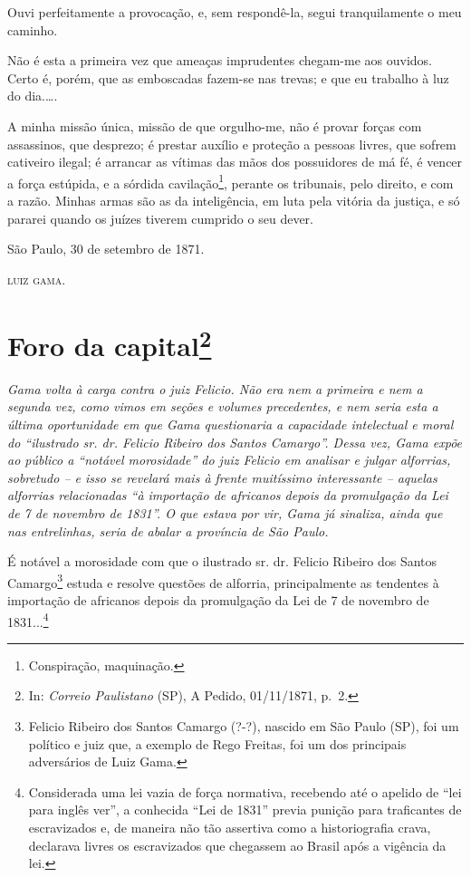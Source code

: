 {Ouvi perfeitamente a provocação, e, sem respondê-la, segui
tranquilamente o meu caminho.

Não é esta a primeira vez que ameaças imprudentes chegam-me aos
ouvidos.\\
Certo é, porém, que as emboscadas fazem-se nas trevas; e que eu trabalho
à luz do dia.\ldots.

A minha missão única, missão de que orgulho-me, não é provar forças com
assassinos, que desprezo; é prestar auxílio e proteção a pessoas livres,
que sofrem cativeiro ilegal; é arrancar as vítimas das mãos dos
possuidores de má fé, é vencer a força estúpida, e a sórdida
cavilação\footnote{ Conspiração, maquinação.}, perante os tribunais,
pelo direito, e com a razão. Minhas armas são as da inteligência, em
luta pela vitória da justiça, e só pararei quando os juízes tiverem
cumprido o seu dever.

São Paulo, 30 de setembro de 1871.

\textsc{luiz gama}.

\chapter{Foro da capital\footnote{ In: \emph{Correio Paulistano} (SP), A Pedido, 01/11/1871,
  p.~2.}} %

\begin{didascalia}
\emph{Gama volta à carga contra o juiz Felicio. Não era nem a primeira e
nem a segunda vez, como vimos em seções e volumes precedentes, e nem
seria esta a última oportunidade em que Gama questionaria a capacidade
intelectual e moral do ``ilustrado sr. dr. Felicio Ribeiro dos Santos
Camargo''. Dessa vez, Gama expõe ao público a ``notável morosidade'' do
juiz Felicio em analisar e julgar alforrias, sobretudo -- e isso se
revelará mais à frente muitíssimo interessante -- aquelas alforrias
relacionadas ``à importação de africanos depois da promulgação da Lei de
7 de novembro de 1831''. O que estava por vir, Gama já sinaliza, ainda
que nas entrelinhas, seria de abalar a província de São Paulo.}
\end{didascalia}

\asterisc{}

É notável a morosidade com que o ilustrado sr. dr. Felicio Ribeiro dos
Santos Camargo\footnote{ Felicio Ribeiro dos Santos Camargo (?-?),
  nascido em São Paulo (SP), foi um político e juiz que, a exemplo de
  Rego Freitas, foi um dos principais adversários de Luiz Gama.} estuda
e resolve questões de alforria, principalmente as tendentes à importação
de africanos depois da promulgação da Lei de 7 de novembro de
1831...\footnote{ Considerada uma lei vazia de força normativa,
  recebendo até o apelido de ``lei para inglês ver'', a conhecida ``Lei de
  1831'' previa punição para traficantes de escravizados e, de maneira
  não tão assertiva como a historiografia crava, declarava livres os
  escravizados que chegassem ao Brasil após a vigência da lei.}

}
